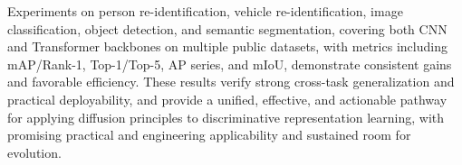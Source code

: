 \begin{englishabstract}
\par
Experiments on person re-identification, vehicle re-identification, image classification, object detection, and semantic segmentation, covering both CNN and Transformer backbones on multiple public datasets, with metrics including mAP/Rank-1, Top-1/Top-5, AP series, and mIoU, demonstrate consistent gains and favorable efficiency. These results verify strong cross-task generalization and practical deployability, and provide a unified, effective, and actionable pathway for applying diffusion principles to discriminative representation learning, with promising practical and engineering applicability and sustained room for evolution.
\par\noindent{}
\end{englishabstract}
